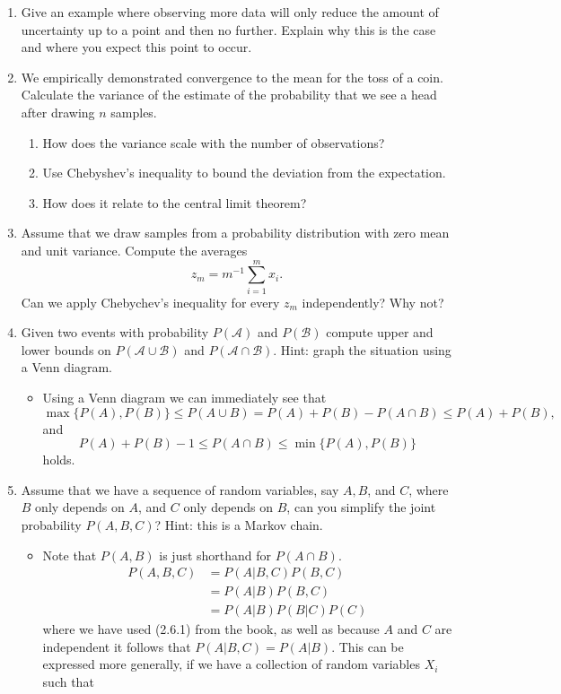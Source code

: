 \documentclass{article}
\begin{document}
\begin{enumerate}
	\item Give an example where observing more data will only reduce the amount of uncertainty up to a point and then no further. Explain why this is the case and where you expect this point to occur.
	\item We empirically demonstrated convergence to the mean for the toss of a coin. Calculate the variance of the estimate of the probability that we see a head after drawing $n$ samples.
		\begin{enumerate}
			\item How does the variance scale with the number of observations?
			\item Use Chebyshev's inequality to bound the deviation from the expectation.
			\item How does it relate to the central limit theorem?
		\end{enumerate}
	\item Assume that we draw samples from a probability distribution with zero mean and unit variance. Compute the averages
	$$
	z_m = m^{-1} \sum_{i = 1}^m x_i.
	$$
	Can we apply Chebychev's inequality for every $z_m$ independently? Why not?
	\item Given two events with probability $P(\mathcal{A})$ and $P(\mathcal{B})$ compute upper and lower bounds on $P(\mathcal{A} \cup \mathcal{B})$ and $P(\mathcal{A} \cap \mathcal{B})$. Hint: graph the situation using a Venn diagram.
		\begin{itemize}
			\item Using a Venn diagram we can immediately see that
			$$
			\max\{P(A), P(B) \} \leq P(A \cup B) = P(A) + P(B) - P(A \cap B) \leq P(A) + P(B),
			$$
			and
			$$
			P(A) + P(B) - 1 \leq P(A \cap B) \leq \min\{P(A), P(B)\}
			$$
			holds.
		\end{itemize}
	\item Assume that we have a sequence of random variables, say $A, B$, and $C$, where $B$ only depends on $A$, and $C$ only depends on $B$, can you simplify the joint probability $P(A, B, C)$? Hint: this is a Markov chain.
		\begin{itemize}
			\item Note that $P(A, B)$ is just shorthand for $P(A \cap B)$.
			\begin{align*}
			P(A, B, C) &= P(A|B, C) P(B, C) \\
			&= P(A|B) P(B, C) \\
			&= P(A|B) P(B|C) P(C)
			\end{align*}
			where we have used (2.6.1) from the book, as well as because $A$ and $C$ are independent it follows that $P(A|B, C) = P(A|B)$. This can be expressed more generally, if we have a collection of random variables $X_i$ such that

\end{itemize}
\end{enumerate}
\end{document}
